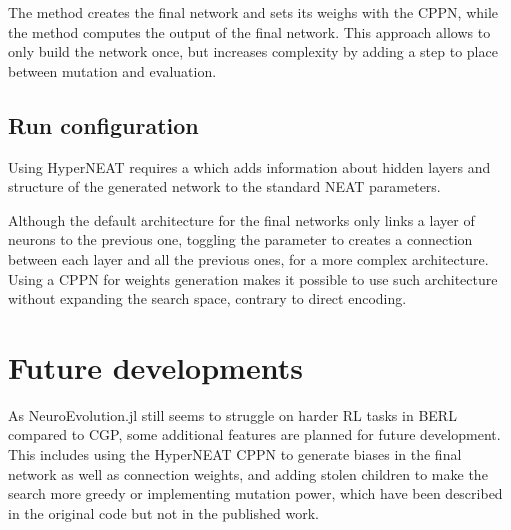 The  method creates the final network and sets its weighs with the CPPN, while the  method computes the output of the final network. This approach allows to only build the network once, but increases complexity by adding a step to place between mutation and evaluation.

\subsection{Run configuration}

Using HyperNEAT requires a  which adds information about hidden layers and structure of the generated network to the standard NEAT parameters. 

Although the default architecture for the final networks only links a layer of neurons to the previous one, toggling the  parameter to  creates a connection between each layer and all the previous ones, for a more complex architecture. Using a CPPN for weights generation makes it possible to use such architecture without expanding the search space, contrary to direct encoding. 

\section{Future developments}

As NeuroEvolution.jl still seems to struggle on harder RL tasks in BERL compared to CGP, some additional features are planned for future development. This includes using the HyperNEAT CPPN to generate biases in the final network as well as connection weights, and adding stolen children to make the search more greedy or implementing mutation power, which have been described in the original code but not in the published work.

